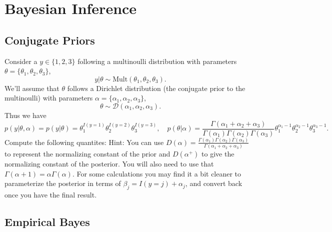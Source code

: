 \documentclass{article}
\begin{document}
\section{Bayesian Inference}

\subsection{Conjugate Priors}

Consider a $y \in \{1,2,3\}$ following a multinoulli distribution with parameters $\theta = \{\theta_1,\theta_2,\theta_3\}$,
\[
y | \theta \sim \text{Mult}(\theta_1,\theta_2,\theta_3).
\]
We'll assume that $\theta$ follows a Dirichlet distribution (the conjugate prior to the multinoulli) with parameters $\alpha = \{\alpha_1,\alpha_2,\alpha_3\}$,
\[
 \theta \sim \mathcal{D}(\alpha_1,\alpha_2,\alpha_3).
\]
Thus we have
\[
p(y|\theta,\alpha) = p(y|\theta) = \theta_1^{I(y=1)}\theta_2^{I(y=2)}\theta_3^{I(y=3)}, \quad p(\theta|\alpha) = \frac{\Gamma(\alpha_1+\alpha_2+\alpha_3)}{\Gamma(\alpha_1)\Gamma(\alpha_2)\Gamma(\alpha_3)}\theta_1^{\alpha_1-1}\theta_2^{\alpha_2-1}\theta_3^{\alpha_3-1}.
\]
Compute the following quantites:
 Hint: You can use $D(\alpha) =  \frac{\Gamma(\alpha_1)\Gamma(\alpha_2)\Gamma(\alpha_3)}{\Gamma(\alpha_1+\alpha_2+\alpha_3)}$ to represent the normalizing constant of the prior and $D(\alpha^+)$ to give the normalizing constant of the posterior. You will also need to use that $\Gamma(\alpha+1) = \alpha\Gamma(\alpha)$. For some calculations you may find it a bit cleaner to parameterize the posterior in terms of $\beta_j = I(y=j) + \alpha_j$, and convert back once you have the final result.



\subsection{Empirical Bayes}
\end{document}
